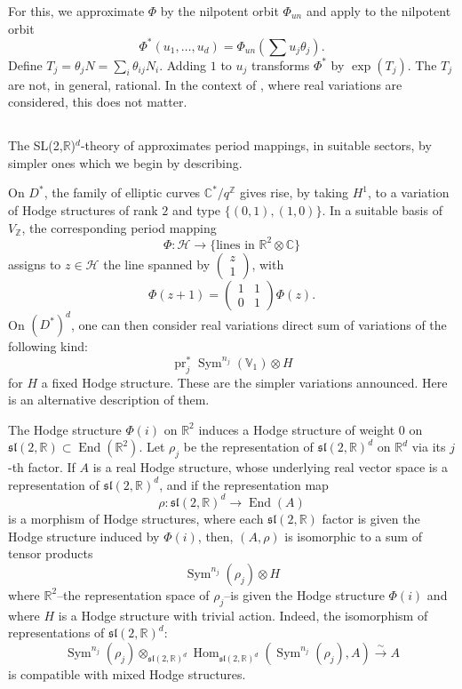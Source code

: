 \documentclass[11pt,a4paper]{article}
\theoremstyle{plain}
\theoremstyle{definition}
\DeclareMathOperator{\Hom}{Hom}
\DeclareMathOperator{\End}{End}
\DeclareMathOperator{\Sym}{Sym}
\DeclareMathOperator{\pr}{pr}
\begin{document}
For this, we approximate $\Phi$ by the nilpotent orbit $\Phi_{un}$ and apply \cite[(4.20)]{cks} to the nilpotent orbit
\[
\Phi^*(u_1,\dots,u_d)=\Phi_{un}(\sum u_j\theta_j).
\]
Define $T_j=\theta_j N=\sum_i\theta_{ij}N_i$. Adding $1$ to $u_j$ transforms $\Phi^*$ by $\exp(T_j)$. The $T_j$ are not, in general, rational. In the context of \cite{cks}, where real variations are considered, this does not matter.

\subsection{}
The SL(2,$\mathbb{R}$)$^d$-theory of \cite{cks} approximates period mappings, in suitable sectors, by simpler ones which we begin by describing.

On $D^*$, the family of elliptic curves $\mathbb{C}^*/q^{\mathbb{Z}}$ gives rise, by taking $H^1$, to a variation of Hodge structures of rank $2$ and type $\{(0,1),(1,0)\}$. In a suitable basis of $V_{\mathbb{Z}}$, the corresponding period mapping
\[
\Phi:\mathcal{H}\to\{\text{lines in }\mathbb{R}^2\otimes\mathbb{C}\}
\]
assigns to $z\in\mathcal{H}$ the line spanned by $\begin{pmatrix} z \\ 1\end{pmatrix}$, with
\[
\Phi(z+1)=\begin{pmatrix} 1 & 1 \\ 0 & 1\end{pmatrix}\Phi(z).
\]
On $(D^*)^d$, one can then consider real variations direct sum of variations of the following kind:
\[
\pr_j^*\Sym^{n_j}(\mathbb{V}_1)\otimes H
\]
for $H$ a fixed Hodge structure. These are the simpler variations announced. Here is an alternative description of them.

The Hodge structure $\Phi(i)$ on $\mathbb{R}^2$ induces a Hodge structure of weight $0$ on $\mathfrak{sl}(2,\mathbb{R})\subset\End(\mathbb{R}^2)$. Let $\rho_j$ be the representation of $\mathfrak{sl}(2,\mathbb{R})^d$ on $\mathbb{R}^d$ via its $j$-th factor. If $A$ is a real Hodge structure, whose underlying real vector space is a representation of $\mathfrak{sl}(2,\mathbb{R})^d$, and if the representation map
\[
\rho:\mathfrak{sl}(2,\mathbb{R})^d\to\End(A)
\]
is a morphism of Hodge structures, where each $\mathfrak{sl}(2,\mathbb{R})$ factor is given the Hodge structure induced by $\Phi(i)$, then, $(A,\rho)$ is isomorphic to a sum of tensor products
\[
\Sym^{n_j}(\rho_j)\otimes H
\]
where $\mathbb{R}^2$--the representation space of $\rho_j$--is given the Hodge structure $\Phi(i)$ and where $H$ is a Hodge structure with trivial action. Indeed, the isomorphism of representations of $\mathfrak{sl}(2,\mathbb{R})^d$:
\[
\Sym^{n_j}(\rho_j)\otimes_{\mathfrak{sl}(2,\mathbb{R})^d}\Hom_{\mathfrak{sl}(2,\mathbb{R})^d}(\Sym^{n_j}(\rho_j),A)\xrightarrow{\sim} A
\]
is compatible with mixed Hodge structures.
\end{document}
